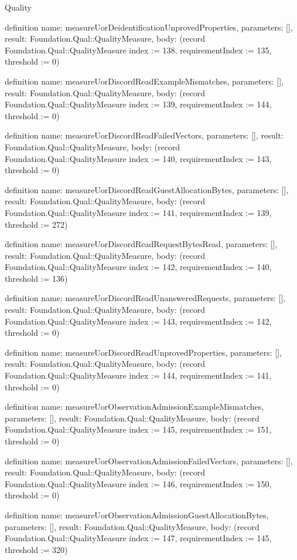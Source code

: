 \begin{lexlean}{Quality}
\begin{semanticmodule}
definition{
  name: measureUorDeidentificationUnprovedProperties,
  parameters: [],
  result: Foundation.Qual::QualityMeasure,
  body: (record Foundation.Qual::QualityMeasure {index := 138, requirementIndex := 135, threshold := 0})
}

definition{
  name: measureUorDiscordReadExampleMismatches,
  parameters: [],
  result: Foundation.Qual::QualityMeasure,
  body: (record Foundation.Qual::QualityMeasure {index := 139, requirementIndex := 144, threshold := 0})
}

definition{
  name: measureUorDiscordReadFailedVectors,
  parameters: [],
  result: Foundation.Qual::QualityMeasure,
  body: (record Foundation.Qual::QualityMeasure {index := 140, requirementIndex := 143, threshold := 0})
}

definition{
  name: measureUorDiscordReadGuestAllocationBytes,
  parameters: [],
  result: Foundation.Qual::QualityMeasure,
  body: (record Foundation.Qual::QualityMeasure {index := 141, requirementIndex := 139, threshold := 272})
}

definition{
  name: measureUorDiscordReadRequestBytesRead,
  parameters: [],
  result: Foundation.Qual::QualityMeasure,
  body: (record Foundation.Qual::QualityMeasure {index := 142, requirementIndex := 140, threshold := 136})
}

definition{
  name: measureUorDiscordReadUnansweredRequests,
  parameters: [],
  result: Foundation.Qual::QualityMeasure,
  body: (record Foundation.Qual::QualityMeasure {index := 143, requirementIndex := 142, threshold := 0})
}

definition{
  name: measureUorDiscordReadUnprovedProperties,
  parameters: [],
  result: Foundation.Qual::QualityMeasure,
  body: (record Foundation.Qual::QualityMeasure {index := 144, requirementIndex := 141, threshold := 0})
}

definition{
  name: measureUorObservationAdmissionExampleMismatches,
  parameters: [],
  result: Foundation.Qual::QualityMeasure,
  body: (record Foundation.Qual::QualityMeasure {index := 145, requirementIndex := 151, threshold := 0})
}

definition{
  name: measureUorObservationAdmissionFailedVectors,
  parameters: [],
  result: Foundation.Qual::QualityMeasure,
  body: (record Foundation.Qual::QualityMeasure {index := 146, requirementIndex := 150, threshold := 0})
}

definition{
  name: measureUorObservationAdmissionGuestAllocationBytes,
  parameters: [],
  result: Foundation.Qual::QualityMeasure,
  body: (record Foundation.Qual::QualityMeasure {index := 147, requirementIndex := 145, threshold := 320})
}


\end{semanticmodule}
\end{lexlean}
